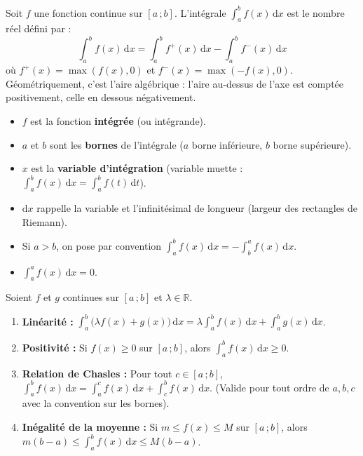 \documentclass[11pt]{article}
\begin{document}
\begin{definition}
Soit $f$ une fonction continue sur $[a\,;b]$. L'intégrale $\displaystyle\int_a^b f(x)\,\mathrm{d}x$ est le nombre réel défini par :
\[
\int_a^b f(x)\,\mathrm{d}x = \int_a^b f^+(x)\,\mathrm{d}x - \int_a^b f^-(x)\,\mathrm{d}x
\]
où $f^+(x)=\max(f(x),0)$ et $f^-(x)=\max(-f(x),0)$. Géométriquement, c'est l'aire algébrique : l'aire au-dessus de l'axe est comptée positivement, celle en dessous négativement.
\end{definition}

\begin{aretenir}
\begin{itemize}
\item $f$ est la fonction \textbf{intégrée} (ou intégrande).
\item $a$ et $b$ sont les \textbf{bornes} de l'intégrale ($a$ borne inférieure, $b$ borne supérieure).
\item $x$ est la \textbf{variable d'intégration} (variable muette : $\int_a^b f(x)\,\mathrm{d}x = \int_a^b f(t)\,\mathrm{d}t$).
\item $\mathrm{d}x$ rappelle la variable et l'infinitésimal de longueur (largeur des rectangles de Riemann).
\item Si $a>b$, on pose par convention $\displaystyle\int_a^b f(x)\,\mathrm{d}x = -\int_b^a f(x)\,\mathrm{d}x$.
\item $\displaystyle\int_a^a f(x)\,\mathrm{d}x = 0$.
\end{itemize}
\end{aretenir}

\begin{propriete}
Soient $f$ et $g$ continues sur $[a\,;b]$ et $\lambda \in \mathbb{R}$.
\begin{enumerate}
\item \textbf{Linéarité :} $\displaystyle\int_a^b \big(\lambda f(x) + g(x)\big)\,\mathrm{d}x = \lambda\int_a^b f(x)\,\mathrm{d}x + \int_a^b g(x)\,\mathrm{d}x$.
\item \textbf{Positivité :} Si $f(x) \ge 0$ sur $[a\,;b]$, alors $\displaystyle\int_a^b f(x)\,\mathrm{d}x \ge 0$.
\item \textbf{Relation de Chasles :} Pour tout $c \in [a\,;b]$, $\displaystyle\int_a^b f(x)\,\mathrm{d}x = \int_a^c f(x)\,\mathrm{d}x + \int_c^b f(x)\,\mathrm{d}x$. (Valide pour tout ordre de $a,b,c$ avec la convention sur les bornes).
\item \textbf{Inégalité de la moyenne :} Si $m \le f(x) \le M$ sur $[a\,;b]$, alors $m(b-a) \le \displaystyle\int_a^b f(x)\,\mathrm{d}x \le M(b-a)$.
\end{enumerate}
\end{propriete}
\end{document}
